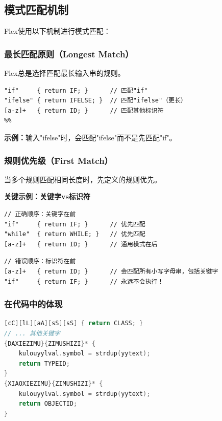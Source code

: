 \documentclass[twocolumn]{article}
\begin{document}
\subsection{模式匹配机制}

Flex使用以下机制进行模式匹配：

\subsubsection{最长匹配原则（Longest Match）}
Flex总是选择匹配最长输入串的规则。

\begin{lstlisting}[language=Flex, caption={最长匹配原则示例}, label=code:longest_match]
%%
"if"     { return IF; }      // 匹配"if"
"ifelse" { return IFELSE; }  // 匹配"ifelse"（更长）
[a-z]+   { return ID; }      // 匹配其他标识符
%%
\end{lstlisting}

\textbf{示例：}输入"ifelse"时，会匹配"ifelse"而不是先匹配"if"。

\subsubsection{规则优先级（First Match）}
当多个规则匹配相同长度时，先定义的规则优先。

\textbf{关键示例：关键字vs标识符}

\begin{lstlisting}[language=Flex, caption={正确的规则顺序}, label=code:correct_order]
// 正确顺序：关键字在前
"if"     { return IF; }      // 优先匹配
"while"  { return WHILE; }   // 优先匹配  
[a-z]+   { return ID; }      // 通用模式在后
\end{lstlisting}

\begin{lstlisting}[language=Flex, caption={错误的规则顺序}, label=code:wrong_order]
// 错误顺序：标识符在前
[a-z]+   { return ID; }      // 会匹配所有小写字母串，包括关键字
"if"     { return IF; }      // 永远不会执行！
\end{lstlisting}

\subsubsection{在代码中的体现}
\begin{lstlisting}[language=C++, caption={模式匹配实现}, label=code:pattern_impl]
[cC][lL][aA][sS][sS] { return CLASS; }
// ... 其他关键字
{DAXIEZIMU}{ZIMUSHIZI}* { 
    kulouyylval.symbol = strdup(yytext);
    return TYPEID;
}
{XIAOXIEZIMU}{ZIMUSHIZI}* { 
    kulouyylval.symbol = strdup(yytext);
    return OBJECTID;
}
\end{lstlisting}
\end{document}
